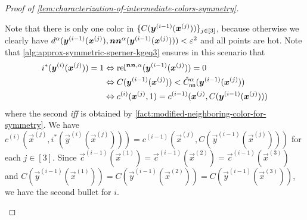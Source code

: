 \begin{proof}[Proof of \cref{lem:characterization-of-intermediate-colors-symmetry}]
\begin{itemize}[itemsep=0.2em,topsep=0.5em]
        Note that there is only one color in $\{{C(\boldsymbol{y}^{(i-1)}(\boldsymbol{x}^{(j)}))} \}_{j\in [3]}$, because otherwise we clearly have $d^\alpha(\boldsymbol{y}^{(i-1)}(\boldsymbol{x}^{(j)}),\operatorname*{\boldsymbol{nn}^{\alpha}}(\boldsymbol{y}^{(i-1)}(\boldsymbol{x}^{(j)})))<\varepsilon^2$ and all points are hot. 
        Note that \cref{alg:approx-symmetric-sperner-kgeq3} ensures in this scenario that 
        \begin{align*}
            i^*(\boldsymbol{y}^{(i)}(\boldsymbol{x}^{(j)}))=1 
            &\Leftrightarrow 
            \operatorname*{rel^{\boldsymbol{nn},\alpha}}(\boldsymbol{y}^{(i-1)}(\boldsymbol{x}^{(j)}))=0\\
            &\Leftrightarrow
            C(\boldsymbol{y}^{(i-1)}(\boldsymbol{x}^{(j)}))<\hat{C}^\alpha_{\sf nn}(\boldsymbol{y}^{(i-1)}(\boldsymbol{x}^{(j)}))\\
            &\Leftrightarrow
            c^{(i)}(\boldsymbol{x}^{(j)},1) = c^{(i-1)}(\boldsymbol{x}^{(j)}, C(\boldsymbol{y}^{(i-1)}(\boldsymbol{x}^{(j)})))
        \end{align*}
        where the second {\em iff} is obtained by \cref{fact:modified-neighboring-color-for-symmetry}.
        We have $c^{(i)}(\vec{x}^{(j)}, i^*(\vec{y}^{(i)}(\vec{x}^{(j)}))) = c^{(i-1)}(\vec{x}^{(j)}, C(\vec{y}^{(i-1)}(\vec{x}^{(j)})))$ for each $j\in [3]$.
        Since $\vec{c}^{(i-1)}(\vec{x}^{(1)})=\vec{c}^{(i-1)}(\vec{x}^{(2)})=\vec{c}^{(i-1)}(\vec{x}^{(3)})$ and $C(\vec{y}^{(i-1)}(\vec{x}^{(1)}))=C(\vec{y}^{(i-1)}(\vec{x}^{(2)}))=C(\vec{y}^{(i-1)}(\vec{x}^{(3)}))$, 
        we have the second bullet for $i$.
    \end{itemize}


\end{proof}
